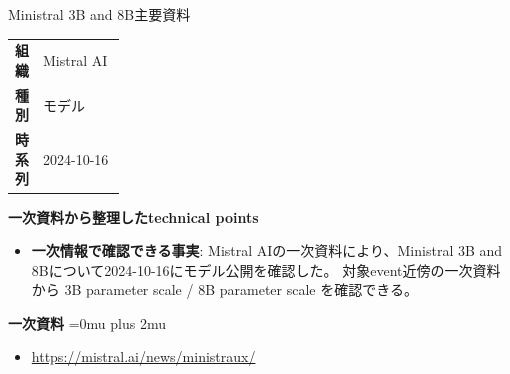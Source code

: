\begin{technicalnote}{Ministral 3B and 8B}{主要資料}
\begingroup
\begin{tabularx}{\linewidth}{@{}>{\bfseries}p{0.22\linewidth}X@{}}
組織 & Mistral AI \\
種別 & モデル \\
時系列 & 2024-10-16 \\
\end{tabularx}
\smallskip
{\bfseries 一次資料から整理したtechnical points}
\begin{itemize}[leftmargin=1.5em,itemsep=0.35em]
\item \textbf{一次情報で確認できる事実}: Mistral AIの一次資料により、Ministral 3B and 8Bについて2024-10-16にモデル公開を確認した。 対象event近傍の一次資料から 3B parameter scale / 8B parameter scale を確認できる。
\end{itemize}
\begin{minipage}{\linewidth}
\begin{samepage}
{\bfseries 一次資料}
\begingroup\sloppy
\Urlmuskip=0mu plus 2mu\relax
\begin{itemize}[leftmargin=1.5em,itemsep=0.25em]
\item {\scriptsize\url{https://mistral.ai/news/ministraux/}}
\end{itemize}
\endgroup
\end{samepage}
\end{minipage}
\endgroup
\end{technicalnote}
\medskip

